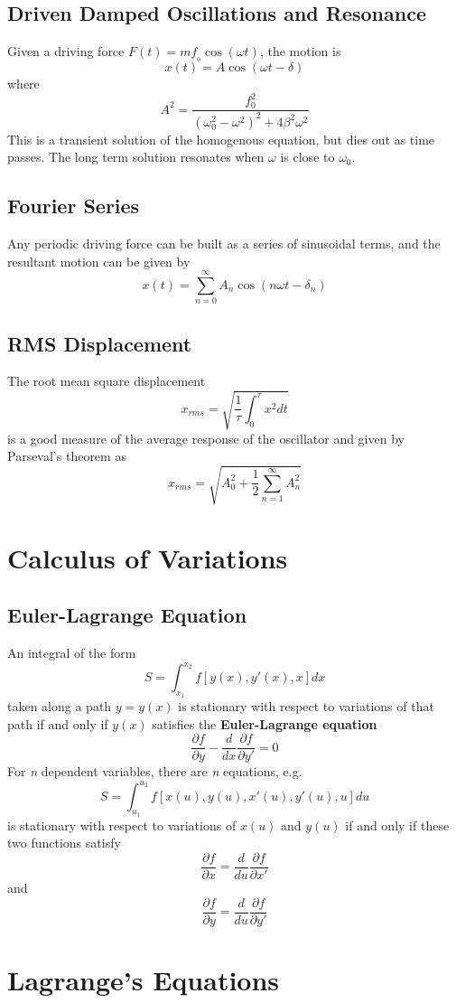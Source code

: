 \documentclass{article}
\begin{document}
\subsection*{Driven Damped Oscillations and Resonance}
Given a driving force $F(t) = mf__0\cos(\omega t)$, the motion is 
$$
x(t) = A\cos(\omega t - \delta)
$$
where 
$$
A^2 = \frac{f_0^2}{(\omega_0^2 - \omega^2)^2 + 4\beta^2\omega^2}
$$
This is a transient solution of the homogenous equation, but dies out as time passes.  The long term solution resonates when $\omega$ is close to $\omega_0$.
\subsection*{Fourier Series}
Any periodic driving force can be built as a series of sinusoidal terms, and the resultant motion can be given by 
$$
x(t) = \sum_{n=0}^\infty A_n\cos(n\omega t - \delta_n)
$$
\subsection*{RMS Displacement}
The root mean square displacement 
$$
x_{rms} = \sqrt{\frac{1}{\tau} \int_0^\tau x^2 dt}
$$
is a good measure of the average response of the oscillator and given by Parseval's theorem as
$$
x_{rms} = \sqrt{A_0^2 + \frac{1}{2}\sum_{n=1}^\infty A_n^2}
$$
\section{Calculus of Variations}
\subsection*{Euler-Lagrange Equation}
An integral of the form
$$
S = \int_{x_{1}}^{x_2} f[y(x), y'(x), x]dx
$$
taken along a path $y=y(x)$ is stationary with respect to variations of that path if and only if $y(x)$ satisfies the \textbf{Euler-Lagrange equation}
$$
\frac{\partial f}{\partial y} - \frac{d}{dx}\frac{\partial f}{\partial y'} = 0
$$
For \textit{n} dependent variables, there are \textit{n} equations, e.g.
$$
S = \int_{u_{1}}^{u_2} f[x(u), y(u), x'(u), y'(u), u]du
$$
is stationary with respect to variations of $x(u)$ and $y(u)$ if and only if these two functions satisfy
$$
\frac{\partial f}{\partial x} = \frac{d}{du}\frac{\partial f}{\partial x'}
$$
and
$$
\frac{\partial f}{\partial y} = \frac{d}{du}\frac{\partial f}{\partial y'}
$$
\section{Lagrange's Equations}
\end{document}
